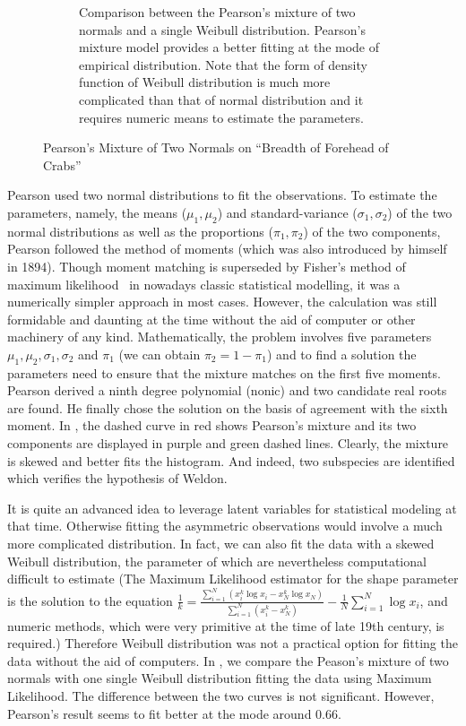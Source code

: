 \begin{figure}[ht!]
\begin{subfigure}[b]{0.95\textwidth}
  \caption{Comparison between the Pearson's mixture of two normals and a single
  Weibull distribution. Pearson's mixture model provides a better fitting at the
  mode of empirical distribution. Note that the form of density function of
  Weibull distribution is much more complicated than that of normal distribution
  and it requires numeric means to estimate the parameters.}
  \label{fig::pearson-crab-weibull}
  \end{subfigure}
  \caption{Pearson's Mixture of Two Normals on ``Breadth of Forehead of Crabs''}
\end{figure}

Pearson used two normal distributions to fit the observations. To estimate the
parameters, namely, the means ($\mu_1, \mu_2$) and standard-variance ($\sigma_1,
\sigma_2$) of the two normal distributions as well as the proportions ($\pi_1,
\pi_2$) of the two components, Pearson followed the method of moments (which
was also introduced by himself in 1894). Though moment matching is superseded
by Fisher's method of maximum likelihood~\cite{pfanzagl1994parametric} in
nowadays classic statistical modelling, it was a numerically simpler approach
in most cases. However, the calculation was still formidable and daunting at
the time without the aid of computer or other machinery of any kind.
Mathematically, the problem involves five parameters $\mu_1, \mu_2, \sigma_1,
\sigma_2$ and $\pi_1$ (we can obtain $\pi_2 = 1 - \pi_1$) and to find a
solution the parameters need to ensure that the mixture matches on the first
five moments. Pearson derived a ninth degree polynomial (nonic) and two
candidate real roots are found. He finally chose the solution on the basis of
agreement with the sixth moment. In , the dashed
curve in red shows Pearson's mixture and its two components are displayed in
purple and green dashed lines. Clearly, the mixture is skewed and better fits
the histogram. And indeed, two subspecies are identified which verifies the
hypothesis of Weldon.

It is quite an advanced idea to leverage latent variables for statistical
modeling at that time. Otherwise fitting the asymmetric observations would
involve a much more complicated distribution. In fact, we can also fit the data
with a skewed Weibull distribution, the parameter of which are nevertheless
computational difficult to estimate (The Maximum Likelihood estimator for the
shape parameter is the solution to the equation $\frac{1}{k} =
\frac{\sum_{i=1}^N (x_i^k\log x_i - x_N^k \log x_N) }{\sum_{i=1}^N (x_i^k -
x_N^k)}- \frac{1}{N}\sum\limits_{i=1}^N \log x_i$, and numeric methods, which
were very primitive at the time of late 19th century, is required.) Therefore
Weibull distribution was not a practical option for fitting the data without the
aid of computers. In , we compare the
Peason's mixture of two normals with one single Weibull distribution fitting the
data using Maximum Likelihood. The difference between the two curves is not
significant. However, Pearson's result seems to fit better at the mode around
$0.66$.

